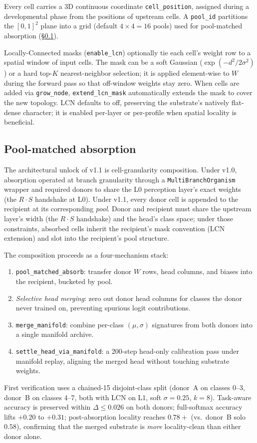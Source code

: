 \documentclass[11pt]{article}
\begin{document}
Every cell carries a 3D continuous coordinate \texttt{cell\_position}, assigned during a developmental phase from the positions of upstream cells.
A \texttt{pool\_id} partitions the $[0,1]^2$ plane into a grid (default $4 \times 4 = 16$ pools) used for pool-matched absorption (\S\ref{sec:absorption}).

Locally-Connected masks (\texttt{enable\_lcn}) optionally tie each cell's weight row to a spatial window of input cells.
The mask can be a soft Gaussian ($\exp(-d^2 / 2\sigma^2)$) or a hard top-$K$ nearest-neighbor selection; it is applied element-wise to $W$ during the forward pass so that off-window weights stay zero.
When cells are added via \texttt{grow\_node}, \texttt{extend\_lcn\_mask} automatically extends the mask to cover the new topology.
LCN defaults to off, preserving the substrate's natively flat-dense character; it is enabled per-layer or per-profile when spatial locality is beneficial.

\subsection{Pool-matched absorption}
\label{sec:absorption}

The architectural unlock of v1.1 is cell-granularity composition.
Under v1.0, absorption operated at branch granularity through a
\texttt{MultiBranchOrganism} wrapper and required donors to share the
L0 perception layer's exact weights (the $R \cdot S$ handshake at L0).
Under v1.1, every donor cell is appended to the recipient at its
corresponding \emph{pool}.
Donor and recipient must share the upstream layer's width (the
$R \cdot S$ handshake) and the head's class space; under those
constraints, absorbed cells inherit the recipient's mask convention
(LCN extension) and slot into the recipient's pool structure.

The composition proceeds as a four-mechanism stack:
\begin{enumerate}[nosep]
  \item \texttt{pool\_matched\_absorb}: transfer donor $W$ rows, head
    columns, and biases into the recipient, bucketed by pool.
  \item \emph{Selective head merging}: zero out donor head columns for
    classes the donor never trained on, preventing spurious logit
    contributions.
  \item \texttt{merge\_manifold}: combine per-class $(\mu, \sigma)$
    signatures from both donors into a single manifold archive.
  \item \texttt{settle\_head\_via\_manifold}: a 200-step head-only
    calibration pass under manifold replay, aligning the merged head
    without touching substrate weights.
\end{enumerate}
First verification uses a chained-15 disjoint-class split (donor~A on
classes 0--3, donor~B on classes 4--7, both with LCN on L1, soft
$\sigma{=}0.25$, $k{=}8$).
Task-aware accuracy is preserved within $\Delta \leq 0.026$ on both
donors; full-softmax accuracy lifts $+0.20$ to $+0.31$; post-absorption
locality reaches $0.78{+}$ (vs.\ donor~B solo $0.58$), confirming that
the merged substrate is \emph{more} locality-clean than either donor
alone.
\end{document}
